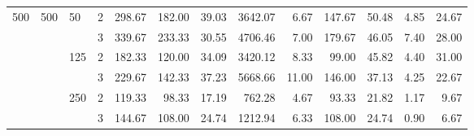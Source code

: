 \begin{tabular}{llllrrrrrrrrr}
\cline{3-13}
\multirow{6}{*}{500} & \multirow{6}{*}{500} & \multirow{2}{*}{50} & 2 & 298.67 & 182.00 &       39.03 & 3642.07 &  6.67 & 147.67 &       50.48 & 4.85 & 24.67 \\
    &     &     & 3 & 339.67 & 233.33 &       30.55 & 4706.46 &  7.00 & 179.67 &       46.05 & 7.40 & 28.00 \\
\cline{3-13}
    &     & \multirow{2}{*}{125} & 2 & 182.33 & 120.00 &       34.09 & 3420.12 &  8.33 &  99.00 &       45.82 & 4.40 & 31.00 \\
    &     &     & 3 & 229.67 & 142.33 &       37.23 & 5668.66 & 11.00 & 146.00 &       37.13 & 4.25 & 22.67 \\
\cline{3-13}
    &     & \multirow{2}{*}{250} & 2 & 119.33 &  98.33 &       17.19 &  762.28 &  4.67 &  93.33 &       21.82 & 1.17 &  9.67 \\
    &     &     & 3 & 144.67 & 108.00 &       24.74 & 1212.94 &  6.33 & 108.00 &       24.74 & 0.90 &  6.67 \\
\bottomrule
\end{tabular}
